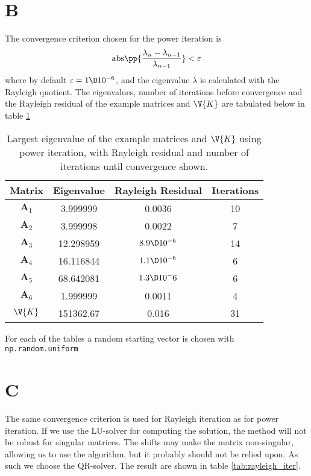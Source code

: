 \documentclass[a4paper,10pt]{article}
\begin{document}
	\section*{B}
	The convergence criterion chosen for the power iteration is
	\begin{equation}\label{key}
		\text{abs}\pp{\frac{\lambda_{n} - \lambda_{n-1}}{\lambda_{n-1}}} < \varepsilon
	\end{equation}
	where by default $ \varepsilon = 1\D 10^{-6} $, and the eigenvalue $ \lambda $ is calculated with the Rayleigh quotient. The eigenvalues, number of iterations before convergence and the Rayleigh residual of the example matrices and $ \V{K} $ are tabulated below in table \ref{tab:power_iter}
	\begin{table}[H]
		\centering
		\begin{tabular}{c|c|c|c}
			Matrix & Eigenvalue & Rayleigh Residual & Iterations \\
			\hline
			$ \textbf{A}_1 $ &  3.999999 & 0.0036 & 10\\
			$ \textbf{A}_2 $ &  3.999998 & 0.0022 & 7\\
			$ \textbf{A}_3 $ & 12.298959 & $ 8.9 \D 10^{-6} $ & 14\\
			$ \textbf{A}_4 $ & 16.116844 & $ 1.1 \D 10^{-6} $ & 6\\
			$ \textbf{A}_5 $ & 68.642081 & $ 1.3\D10^-6 $ & 6\\
			$ \textbf{A}_6 $ &  1.999999 & 0.0011 & 4\\
			$ \V{K} $ & 151362.67 & 0.016 & 31
		\end{tabular}
		\caption{Largest eigenvalue of the example matrices and $ \V{K} $ using power iteration, with Rayleigh residual and number of iterations until convergence shown.}
		\label{tab:power_iter}
	\end{table}
	For each of the tables a random starting vector is chosen with \texttt{np.random.uniform}
	
	\section*{C}
	The same convergence criterion is used for Rayleigh iteration as for power iteration. If we use the LU-solver for computing the solution, the method will not be robust for singular matrices. The shifts may make the matrix non-singular, allowing us to use the algorithm, but it probably should not be relied upon. As such we choose the QR-solver. The result are shown in table \ref{tab:rayleigh_iter}.
	
\end{document}
